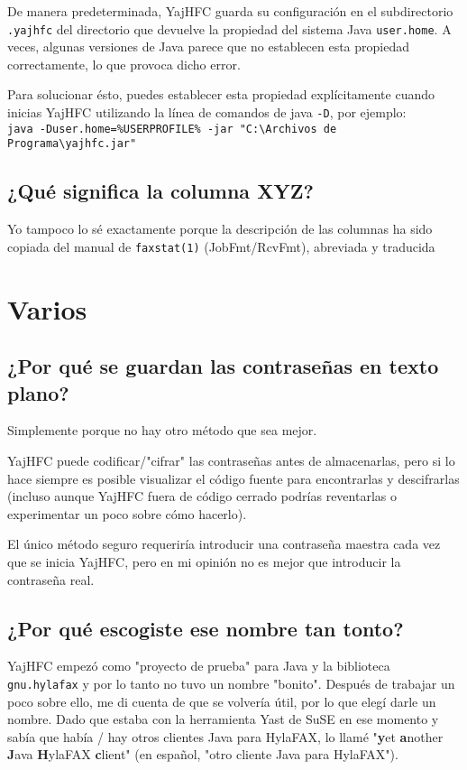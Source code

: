 \documentclass[a4paper,10pt]{scrartcl}
\begin{document}
De manera predeterminada, YajHFC guarda su configuración en el subdirectorio \texttt{.yajhfc} del directorio que devuelve
la propiedad del sistema Java \texttt{user.home}.
A veces, algunas versiones de Java parece que no establecen esta propiedad correctamente, lo que provoca dicho error.

Para solucionar ésto, puedes establecer esta propiedad explícitamente cuando inicias YajHFC utilizando la línea de comandos de java \texttt{-D}, por ejemplo:\\
\texttt{java -Duser.home=\%USERPROFILE\% -jar "C:\textbackslash Archivos de Programa\textbackslash yajhfc.jar"}

\subsection{¿Qué significa la columna XYZ?}

Yo tampoco lo sé exactamente porque la descripción de las columnas ha sido copiada del manual de  \verb#faxstat(1)# (JobFmt/RcvFmt), abreviada y traducida

\section{Varios}

\subsection{¿Por qué se guardan las contraseñas en texto plano?}

Simplemente porque no hay otro método que sea mejor.


YajHFC puede codificar/"cifrar" las contraseñas antes de almacenarlas, 
pero si lo hace siempre es posible visualizar el código fuente para encontrarlas 
y descifrarlas (incluso aunque YajHFC fuera de código cerrado podrías reventarlas o experimentar un poco sobre cómo hacerlo).


El único método seguro requeriría introducir una contraseña maestra cada vez que se inicia YajHFC, pero en mi opinión no es mejor que introducir la contraseña real.


\subsection{¿Por qué escogiste ese nombre tan tonto?}

YajHFC empezó como "proyecto de prueba" para Java y la biblioteca \texttt{gnu.hylafax}
y por lo tanto no tuvo un nombre "bonito". Después de trabajar un poco sobre ello, me di cuenta de que se volvería útil, por lo que elegí darle un nombre.
Dado que estaba con la herramienta Yast de SuSE en ese momento y sabía 
que había / hay otros clientes Java para HylaFAX, lo llamé "\textbf{y}et \textbf{a}nother \textbf{J}ava \textbf{H}ylaFAX \textbf{c}lient" (en español, "otro cliente Java para HylaFAX").
 
\end{document}
